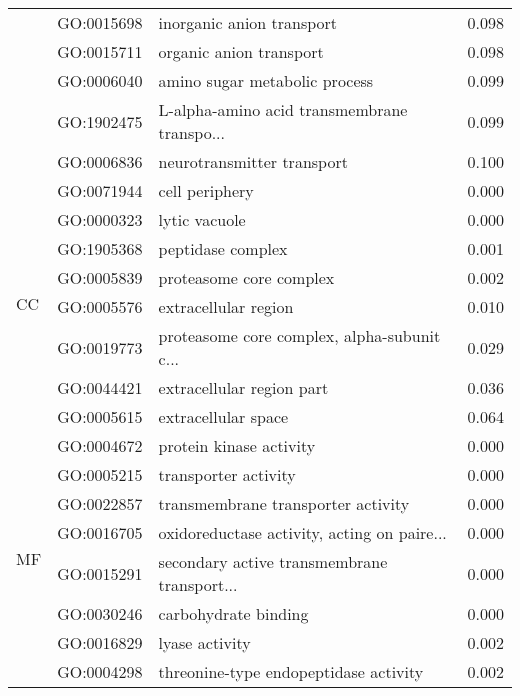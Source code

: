 \begin{longtable}{lllr}
   & GO:0015698 &                    inorganic anion transport &         0.098 \\
   & GO:0015711 &                      organic anion transport &         0.098 \\
   & GO:0006040 &                amino sugar metabolic process &         0.099 \\
   & GO:1902475 &  L-alpha-amino acid transmembrane transpo... &         0.099 \\
   & GO:0006836 &                   neurotransmitter transport &         0.100 \\
\cline{1-4}
\multirow{8}{*}{CC} & GO:0071944 &                               cell periphery &         0.000 \\
   & GO:0000323 &                                lytic vacuole &         0.000 \\
   & GO:1905368 &                            peptidase complex &         0.001 \\
   & GO:0005839 &                      proteasome core complex &         0.002 \\
   & GO:0005576 &                         extracellular region &         0.010 \\
   & GO:0019773 &  proteasome core complex, alpha-subunit c... &         0.029 \\
   & GO:0044421 &                    extracellular region part &         0.036 \\
   & GO:0005615 &                          extracellular space &         0.064 \\
\cline{1-4}
\multirow{78}{*}{MF} & GO:0004672 &                      protein kinase activity &         0.000 \\
   & GO:0005215 &                         transporter activity &         0.000 \\
   & GO:0022857 &           transmembrane transporter activity &         0.000 \\
   & GO:0016705 &  oxidoreductase activity, acting on paire... &         0.000 \\
   & GO:0015291 &  secondary active transmembrane transport... &         0.000 \\
   & GO:0030246 &                         carbohydrate binding &         0.000 \\
   & GO:0016829 &                               lyase activity &         0.002 \\
   & GO:0004298 &        threonine-type endopeptidase activity &         0.002 \\

\end{longtable}
